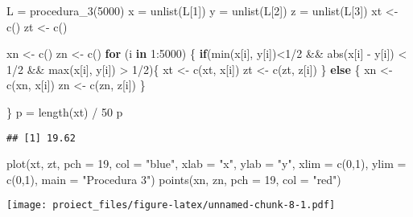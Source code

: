 \documentclass[
]{article}
\newenvironment{Shaded}{\begin{snugshade}}{\end{snugshade}}
\newcommand{\AttributeTok}[1]{\textcolor[rgb]{0.77,0.63,0.00}{#1}}
\newcommand{\ControlFlowTok}[1]{\textcolor[rgb]{0.13,0.29,0.53}{\textbf{#1}}}
\newcommand{\DecValTok}[1]{\textcolor[rgb]{0.00,0.00,0.81}{#1}}
\newcommand{\FunctionTok}[1]{\textcolor[rgb]{0.00,0.00,0.00}{#1}}
\newcommand{\NormalTok}[1]{#1}
\newcommand{\OtherTok}[1]{\textcolor[rgb]{0.56,0.35,0.01}{#1}}
\newcommand{\SpecialCharTok}[1]{\textcolor[rgb]{0.00,0.00,0.00}{#1}}
\newcommand{\StringTok}[1]{\textcolor[rgb]{0.31,0.60,0.02}{#1}}
\begin{document}
\begin{Shaded}
\begin{Highlighting}[]
\NormalTok{L }\OtherTok{=} \FunctionTok{procedura\_3}\NormalTok{(}\DecValTok{5000}\NormalTok{)}
\NormalTok{x }\OtherTok{=} \FunctionTok{unlist}\NormalTok{(L[}\DecValTok{1}\NormalTok{])}
\NormalTok{y }\OtherTok{=} \FunctionTok{unlist}\NormalTok{(L[}\DecValTok{2}\NormalTok{])}
\NormalTok{z }\OtherTok{=} \FunctionTok{unlist}\NormalTok{(L[}\DecValTok{3}\NormalTok{])}
\NormalTok{xt }\OtherTok{\textless{}{-}} \FunctionTok{c}\NormalTok{()}
\NormalTok{zt }\OtherTok{\textless{}{-}} \FunctionTok{c}\NormalTok{()}

\NormalTok{xn }\OtherTok{\textless{}{-}} \FunctionTok{c}\NormalTok{()}
\NormalTok{zn }\OtherTok{\textless{}{-}} \FunctionTok{c}\NormalTok{()}
\ControlFlowTok{for}\NormalTok{ (i }\ControlFlowTok{in} \DecValTok{1}\SpecialCharTok{:}\DecValTok{5000}\NormalTok{)}
\NormalTok{\{}
  \ControlFlowTok{if}\NormalTok{(}\FunctionTok{min}\NormalTok{(x[i], y[i])}\SpecialCharTok{\textless{}}\DecValTok{1}\SpecialCharTok{/}\DecValTok{2} \SpecialCharTok{\&\&} \FunctionTok{abs}\NormalTok{(x[i] }\SpecialCharTok{{-}}\NormalTok{ y[i]) }\SpecialCharTok{\textless{}} \DecValTok{1}\SpecialCharTok{/}\DecValTok{2} \SpecialCharTok{\&\&} \FunctionTok{max}\NormalTok{(x[i], y[i]) }\SpecialCharTok{\textgreater{}} \DecValTok{1}\SpecialCharTok{/}\DecValTok{2}\NormalTok{)\{}
\NormalTok{    xt }\OtherTok{\textless{}{-}} \FunctionTok{c}\NormalTok{(xt, x[i])}
\NormalTok{    zt }\OtherTok{\textless{}{-}} \FunctionTok{c}\NormalTok{(zt, z[i])}
\NormalTok{  \}}
  \ControlFlowTok{else}\NormalTok{ \{}
\NormalTok{    xn }\OtherTok{\textless{}{-}} \FunctionTok{c}\NormalTok{(xn, x[i])}
\NormalTok{    zn }\OtherTok{\textless{}{-}} \FunctionTok{c}\NormalTok{(zn, z[i])}
\NormalTok{  \}}

\NormalTok{\}}
\NormalTok{p }\OtherTok{=} \FunctionTok{length}\NormalTok{(xt) }\SpecialCharTok{/} \DecValTok{50}
\NormalTok{p}
\end{Highlighting}
\end{Shaded}

\begin{verbatim}
## [1] 19.62
\end{verbatim}

\begin{Shaded}
\begin{Highlighting}[]
\FunctionTok{plot}\NormalTok{(xt, zt, }\AttributeTok{pch =} \DecValTok{19}\NormalTok{, }\AttributeTok{col =} \StringTok{"blue"}\NormalTok{, }\AttributeTok{xlab =} \StringTok{"x"}\NormalTok{, }\AttributeTok{ylab =} \StringTok{"y"}\NormalTok{, }\AttributeTok{xlim =} \FunctionTok{c}\NormalTok{(}\DecValTok{0}\NormalTok{,}\DecValTok{1}\NormalTok{), }\AttributeTok{ylim =} \FunctionTok{c}\NormalTok{(}\DecValTok{0}\NormalTok{,}\DecValTok{1}\NormalTok{), }\AttributeTok{main =} \StringTok{"Procedura 3"}\NormalTok{)}
\FunctionTok{points}\NormalTok{(xn, zn, }\AttributeTok{pch =} \DecValTok{19}\NormalTok{, }\AttributeTok{col =} \StringTok{"red"}\NormalTok{)}
\end{Highlighting}
\end{Shaded}

\texttt{[image: proiect\_files/figure-latex/unnamed-chunk-8-1.pdf]}
\end{document}
